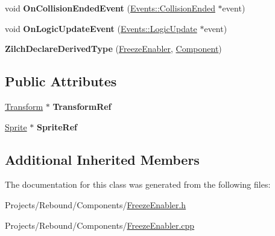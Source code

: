 \begin{DoxyCompactItemize}
\item 
\hypertarget{classDCEngine_1_1Components_1_1FreezeEnabler_af55a4df76df6a46a45bba95e8033e61e}{void {\bfseries On\-Collision\-Ended\-Event} (\hyperlink{classDCEngine_1_1Events_1_1CollisionEnded}{Events\-::\-Collision\-Ended} $\ast$event)}\label{classDCEngine_1_1Components_1_1FreezeEnabler_af55a4df76df6a46a45bba95e8033e61e}

\item 
\hypertarget{classDCEngine_1_1Components_1_1FreezeEnabler_a6bbf2c29cbf67821c598869b9ca2fb78}{void {\bfseries On\-Logic\-Update\-Event} (\hyperlink{classDCEngine_1_1Events_1_1LogicUpdate}{Events\-::\-Logic\-Update} $\ast$event)}\label{classDCEngine_1_1Components_1_1FreezeEnabler_a6bbf2c29cbf67821c598869b9ca2fb78}

\item 
\hypertarget{classDCEngine_1_1Components_1_1FreezeEnabler_aa259f69734418e13274d39f31569840a}{{\bfseries Zilch\-Declare\-Derived\-Type} (\hyperlink{classDCEngine_1_1Components_1_1FreezeEnabler}{Freeze\-Enabler}, \hyperlink{classDCEngine_1_1Component}{Component})}\label{classDCEngine_1_1Components_1_1FreezeEnabler_aa259f69734418e13274d39f31569840a}

\end{DoxyCompactItemize}
\subsection*{Public Attributes}
\begin{DoxyCompactItemize}
\item 
\hypertarget{classDCEngine_1_1Components_1_1FreezeEnabler_a81322a1768592df72856df21de378e18}{\hyperlink{classDCEngine_1_1Components_1_1Transform}{Transform} $\ast$ {\bfseries Transform\-Ref}}\label{classDCEngine_1_1Components_1_1FreezeEnabler_a81322a1768592df72856df21de378e18}

\item 
\hypertarget{classDCEngine_1_1Components_1_1FreezeEnabler_a98b80f854edcfb5427d717db17e6bfed}{\hyperlink{classDCEngine_1_1Components_1_1Sprite}{Sprite} $\ast$ {\bfseries Sprite\-Ref}}\label{classDCEngine_1_1Components_1_1FreezeEnabler_a98b80f854edcfb5427d717db17e6bfed}

\end{DoxyCompactItemize}
\subsection*{Additional Inherited Members}


The documentation for this class was generated from the following files\-:\begin{DoxyCompactItemize}
\item 
Projects/\-Rebound/\-Components/\hyperlink{FreezeEnabler_8h}{Freeze\-Enabler.\-h}\item 
Projects/\-Rebound/\-Components/\hyperlink{FreezeEnabler_8cpp}{Freeze\-Enabler.\-cpp}\end{DoxyCompactItemize}
